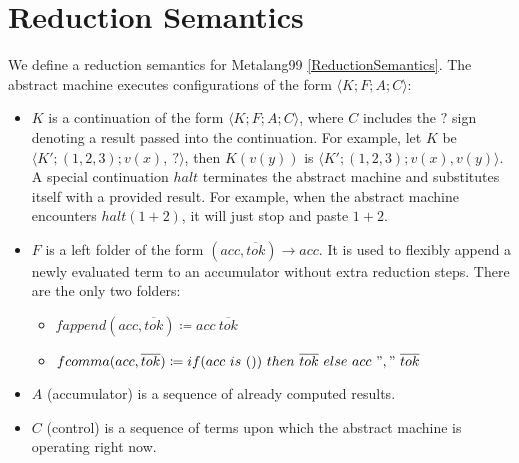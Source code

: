 \documentclass[12pt]{article}
\theoremstyle{break}
\begin{document}
\section{Reduction Semantics}

We define a reduction semantics for Metalang99 \ref{ReductionSemantics}. The abstract
machine executes configurations of the form $\langle K; F; A; C \rangle$:

\begin{itemize}
    \item $K$ is a continuation of the form $\langle K; F; A; C \rangle$, where
    $C$ includes the $?$ sign denoting a result passed into the continuation.
    For example, let $K$ be $\langle K'; (1, 2, 3); v(x), \ ? \rangle$,
    then $K(v(y))$ is $\langle K'; (1, 2, 3); v(x), v(y) \rangle$. A special
    continuation $halt$ terminates the abstract machine and substitutes itself
    with a provided result. For example, when the abstract machine encounters
    $halt(1 + 2)$, it will just stop and paste $1 + 2$.

    \item $F$ is a left folder of the form $(acc, \overline{tok}) \to acc$. It is used
    to flexibly append a newly evaluated term to an accumulator without extra reduction
    steps. There are the only two folders:
    \begin{itemize}
        \item $fappend(acc, \overline{tok}) \coloneqq acc \ \overline{tok}$
        \item $fcomma(acc, \overline{tok}) \coloneqq if (acc \ is \ ()) \ then \ \overline{tok} \ else \ acc \ "," \ \overline{tok}$
    \end{itemize}

    \item $A$ (accumulator) is a sequence of already computed results.

    \item $C$ (control) is a sequence of terms upon which the abstract
    machine is operating right now.
\end{itemize}
\end{document}
